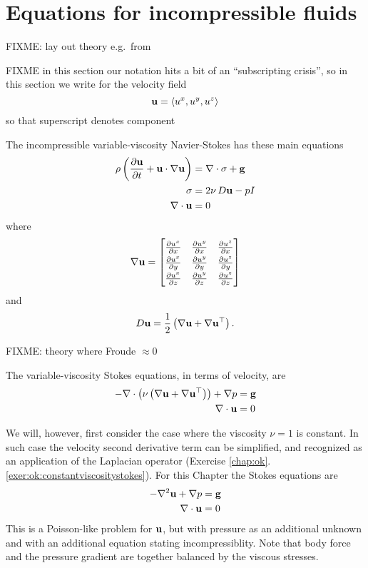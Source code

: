 
\section{Equations for incompressible fluids}

FIXME: lay out theory e.g.~from \citep{Acheson1990,Ockendonetal2003}

FIXME in this section our notation hits a bit of an ``subscripting crisis'', so in this section we write for the velocity field
    $$\mathbf{u} = \left<u^x,u^y,u^z\right>$$
so that superscript denotes component

The incompressible variable-viscosity Navier-Stokes has these main equations
\begin{align}
\rho \left(\frac{\partial \mathbf{u}}{\partial t} + \mathbf{u} \cdot \nabla \mathbf{u}\right) &= \nabla\cdot \sigma + \mathbf{g} \label{eq:ok:stokesgeneralconserve} \\
\sigma &= 2 \nu\, D \mathbf{u} - p I \label{eq:ok:stokesgenerallaw} \\
\nabla\cdot \mathbf{u} &= 0 \label{eq:ok:stokesgeneralincomp}
\end{align}
where
\begin{equation}
\grad \bu = \renewcommand{\arraystretch}{1.3}\begin{bmatrix}
    \frac{\partial u^x}{\partial x} & \frac{\partial u^y}{\partial x} & \frac{\partial u^z}{\partial x} \\
    \frac{\partial u^x}{\partial y} & \frac{\partial u^y}{\partial y} & \frac{\partial u^z}{\partial y} \\
    \frac{\partial u^x}{\partial z} & \frac{\partial u^y}{\partial z} & \frac{\partial u^z}{\partial z}
    \end{bmatrix}  \label{eq:ok:gradudefinition}
\end{equation}
and
    $$D \mathbf{u} = \frac{1}{2} \left(\nabla \mathbf{u} + \nabla \mathbf{u}^{\top}\right).$$

FIXME: theory where Froude $\approx 0$

The variable-viscosity Stokes equations, in terms of velocity, are
\begin{align*}
- \nabla\cdot \left(\nu \left(\nabla \mathbf{u} + \nabla \mathbf{u}^{\top}\right)\right) + \nabla p &= \mathbf{g} \\
\nabla\cdot \mathbf{u} &= 0
\end{align*}

We will, however, first consider the case where the viscosity $\nu=1$ is constant.  In such case the velocity second derivative term can be simplified, and recognized as an application of the Laplacian operator (Exercise \ref{chap:ok}.\ref{exer:ok:constantviscositystokes}).  For this Chapter the Stokes equations are
\begin{align}
- \nabla^2 \mathbf{u} + \nabla p &= \mathbf{g}  \label{eq:ok:constantviscositystokes} \\
\nabla\cdot \mathbf{u} &= 0  \label{eq:ok:constantviscosityincomp}
\end{align}
This is a Poisson-like problem for $\mathbf{u}$, but with pressure as an additional unknown and with an additional equation stating incompressiblity.  Note that body force and the pressure gradient are together balanced by the viscous stresses. 


